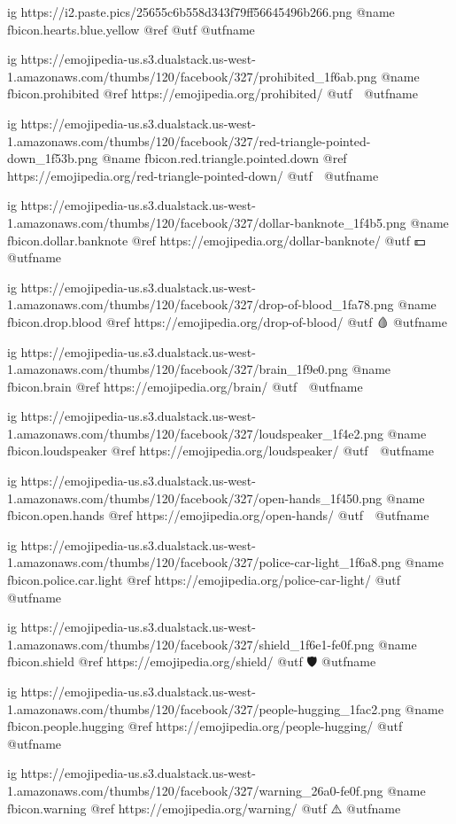 	ig https://i2.paste.pics/25655c6b558d343f79ff56645496b266.png
	@name fbicon.hearts.blue.yellow
	@ref
	@utf
	@utfname

	ig https://emojipedia-us.s3.dualstack.us-west-1.amazonaws.com/thumbs/120/facebook/327/prohibited_1f6ab.png
	@name fbicon.prohibited
	@ref https://emojipedia.org/prohibited/
	@utf 🚫
	@utfname

	ig https://emojipedia-us.s3.dualstack.us-west-1.amazonaws.com/thumbs/120/facebook/327/red-triangle-pointed-down_1f53b.png
	@name fbicon.red.triangle.pointed.down
	@ref https://emojipedia.org/red-triangle-pointed-down/
	@utf 🔻
	@utfname

	ig https://emojipedia-us.s3.dualstack.us-west-1.amazonaws.com/thumbs/120/facebook/327/dollar-banknote_1f4b5.png
	@name fbicon.dollar.banknote
	@ref https://emojipedia.org/dollar-banknote/
	@utf 💵
	@utfname

	ig https://emojipedia-us.s3.dualstack.us-west-1.amazonaws.com/thumbs/120/facebook/327/drop-of-blood_1fa78.png
	@name fbicon.drop.blood
	@ref https://emojipedia.org/drop-of-blood/
	@utf 🩸
	@utfname

	ig https://emojipedia-us.s3.dualstack.us-west-1.amazonaws.com/thumbs/120/facebook/327/brain_1f9e0.png
	@name fbicon.brain
	@ref https://emojipedia.org/brain/
	@utf 🧠
	@utfname

	ig https://emojipedia-us.s3.dualstack.us-west-1.amazonaws.com/thumbs/120/facebook/327/loudspeaker_1f4e2.png
	@name fbicon.loudspeaker
	@ref https://emojipedia.org/loudspeaker/
	@utf 📢
	@utfname

	ig https://emojipedia-us.s3.dualstack.us-west-1.amazonaws.com/thumbs/120/facebook/327/open-hands_1f450.png
	@name fbicon.open.hands
	@ref https://emojipedia.org/open-hands/
	@utf 👐
	@utfname

	ig https://emojipedia-us.s3.dualstack.us-west-1.amazonaws.com/thumbs/120/facebook/327/police-car-light_1f6a8.png
	@name fbicon.police.car.light
	@ref https://emojipedia.org/police-car-light/
	@utf 🚨
	@utfname

	ig https://emojipedia-us.s3.dualstack.us-west-1.amazonaws.com/thumbs/120/facebook/327/shield_1f6e1-fe0f.png
	@name fbicon.shield
	@ref https://emojipedia.org/shield/
	@utf 🛡
	@utfname

	ig https://emojipedia-us.s3.dualstack.us-west-1.amazonaws.com/thumbs/120/facebook/327/people-hugging_1fac2.png
	@name fbicon.people.hugging
	@ref https://emojipedia.org/people-hugging/
	@utf
	@utfname

	ig https://emojipedia-us.s3.dualstack.us-west-1.amazonaws.com/thumbs/120/facebook/327/warning_26a0-fe0f.png
	@name fbicon.warning
	@ref https://emojipedia.org/warning/
	@utf ⚠️
	@utfname

